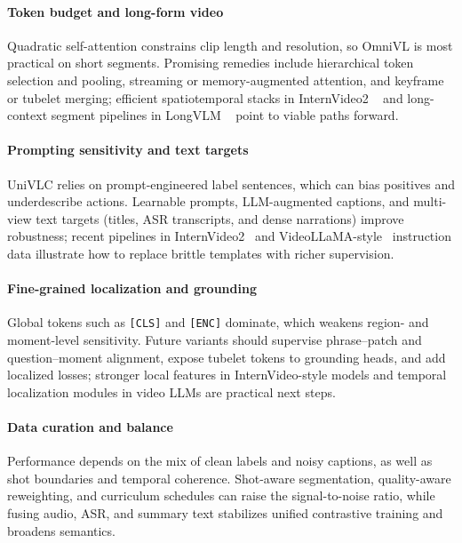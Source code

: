 \begin{enrichment}
\begin{enrichment}
        \paragraph{Token budget and long-form video}
        Quadratic self-attention constrains clip length and resolution, so OmniVL is most practical on short segments.
        Promising remedies include hierarchical token selection and pooling, streaming or memory-augmented attention, and keyframe or tubelet merging; efficient spatiotemporal stacks in InternVideo2 ~\cite{wang2024_internvideo2} and long-context segment pipelines in LongVLM ~\cite{weng2024_longvlm} point to viable paths forward.
        
        \paragraph{Prompting sensitivity and text targets}
        UniVLC relies on prompt-engineered label sentences, which can bias positives and underdescribe actions.
        Learnable prompts, LLM-augmented captions, and multi-view text targets (titles, ASR transcripts, and dense narrations) improve robustness; recent pipelines in InternVideo2~\cite{wang2024_internvideo2} and VideoLLaMA-style~\cite{cheng2024_videollama2} instruction data illustrate how to replace brittle templates with richer supervision.
        
        \paragraph{Fine-grained localization and grounding}
        Global tokens such as \texttt{[CLS]} and \texttt{[ENC]} dominate, which weakens region- and moment-level sensitivity.
        Future variants should supervise phrase–patch and question–moment alignment, expose tubelet tokens to grounding heads, and add localized losses; stronger local features in InternVideo-style models and temporal localization modules in video LLMs are practical next steps.
        
        \paragraph{Data curation and balance}
        Performance depends on the mix of clean labels and noisy captions, as well as shot boundaries and temporal coherence.
        Shot-aware segmentation, quality-aware reweighting, and curriculum schedules can raise the signal-to-noise ratio, while fusing audio, ASR, and summary text stabilizes unified contrastive training and broadens semantics.
        

\end{enrichment}
\end{enrichment}

